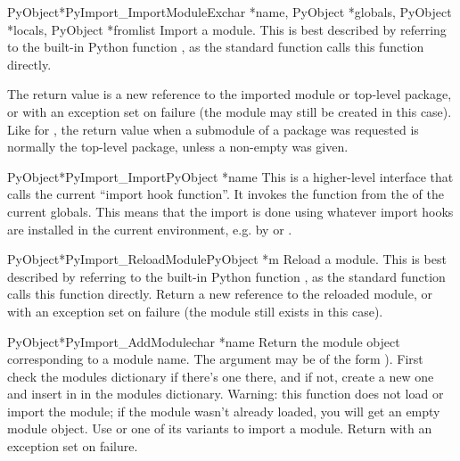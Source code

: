 \documentclass{manual}
\begin{document}
\begin{cfuncdesc}{PyObject*}{PyImport_ImportModuleEx}{char *name,
                       PyObject *globals, PyObject *locals, PyObject *fromlist}
Import a module.  This is best described by referring to the built-in
Python function , as
the standard  function calls this function
directly.

The return value is a new reference to the imported module or
top-level package, or \NULL{} with an exception set on failure
(the module may still be created in this case).  Like for
, the return value when a submodule of a
package was requested is normally the top-level package, unless a
non-empty  was given.
\end{cfuncdesc}

\begin{cfuncdesc}{PyObject*}{PyImport_Import}{PyObject *name}
This is a higher-level interface that calls the current ``import hook
function''.  It invokes the  function from the
 of the current globals.  This means that the
import is done using whatever import hooks are installed in the
current environment, e.g. by  or
.
\end{cfuncdesc}

\begin{cfuncdesc}{PyObject*}{PyImport_ReloadModule}{PyObject *m}
Reload a module.  This is best described by referring to the built-in
Python function , as the standard
 function calls this function directly.  Return a
new reference to the reloaded module, or \NULL{} with an exception set
on failure (the module still exists in this case).
\end{cfuncdesc}

\begin{cfuncdesc}{PyObject*}{PyImport_AddModule}{char *name}
Return the module object corresponding to a module name.  The
 argument may be of the form ).  First
check the modules dictionary if there's one there, and if not, create
a new one and insert in in the modules dictionary.
Warning: this function does not load or import the module; if the
module wasn't already loaded, you will get an empty module object.
Use  or one of its variants to
import a module.
Return \NULL{} with an exception set on failure.
\end{cfuncdesc}
\end{document}
